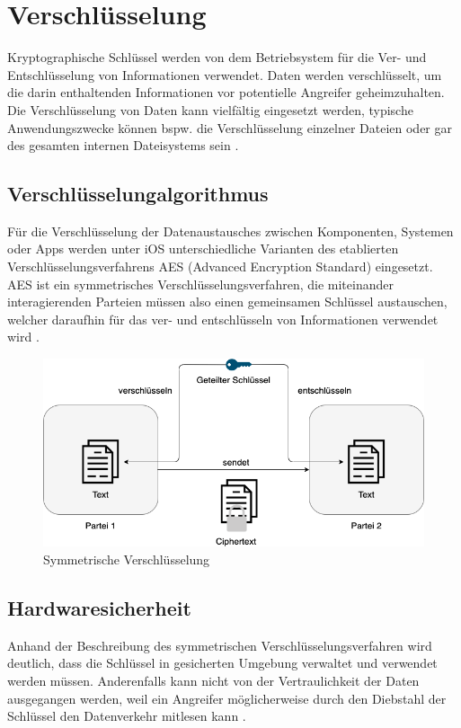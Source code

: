 \section{Verschlüsselung}
Kryptographische Schlüssel werden von dem Betriebsystem für die Ver- und Entschlüsselung von 
Informationen verwendet. Daten werden verschlüsselt, um die darin enthaltenden Informationen 
vor potentielle Angreifer geheimzuhalten. Die Verschlüsselung von Daten kann vielfältig eingesetzt 
werden, typische Anwendungszwecke können bspw. die Verschlüsselung einzelner Dateien oder gar 
des gesamten internen Dateisystems sein \cite{symmetricenc}.


\subsection{Verschlüsselungalgorithmus}
Für die Verschlüsselung der Datenaustausches zwischen Komponenten, Systemen oder Apps
werden unter iOS unterschiedliche Varianten des etablierten Verschlüsselungsverfahrens
AES (Advanced Encryption Standard) eingesetzt. AES ist ein symmetrisches Verschlüsselungsverfahren,
die miteinander interagierenden Parteien müssen also einen gemeinsamen Schlüssel austauschen, welcher
daraufhin für das ver- und entschlüsseln von Informationen verwendet wird
\cite{symmetricenc,apple2020}.

	\begin{figure}[h]
		\centering
		\includegraphics[width=135mm]{images/symmetric.png}
		\caption{Symmetrische Verschlüsselung \cite{symmetricenc}}
		\label{fig:symmetric}
	\end{figure}

\pagebreak

\subsection{Hardwaresicherheit}
Anhand der Beschreibung des symmetrischen Verschlüsselungsverfahren wird deutlich, dass die Schlüssel in
gesicherten Umgebung verwaltet und verwendet werden müssen. Anderenfalls kann nicht von der Vertraulichkeit 
der Daten ausgegangen werden, weil ein Angreifer möglicherweise durch den Diebstahl der Schlüssel den Datenverkehr
mitlesen kann \cite{apple2020}.

